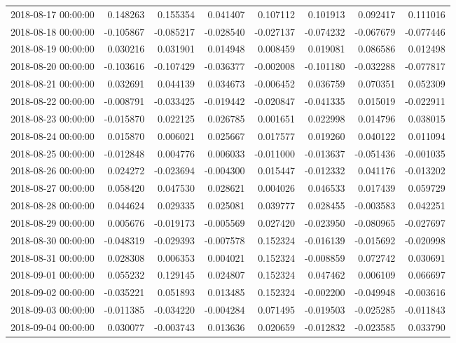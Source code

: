 \begin{tabular}{lrrrrrrr}
2018-08-17 00:00:00 & 0.148263 & 0.155354 & 0.041407 & 0.107112 & 0.101913 & 0.092417 & 0.111016 \\
2018-08-18 00:00:00 & -0.105867 & -0.085217 & -0.028540 & -0.027137 & -0.074232 & -0.067679 & -0.077446 \\
2018-08-19 00:00:00 & 0.030216 & 0.031901 & 0.014948 & 0.008459 & 0.019081 & 0.086586 & 0.012498 \\
2018-08-20 00:00:00 & -0.103616 & -0.107429 & -0.036377 & -0.002008 & -0.101180 & -0.032288 & -0.077817 \\
2018-08-21 00:00:00 & 0.032691 & 0.044139 & 0.034673 & -0.006452 & 0.036759 & 0.070351 & 0.052309 \\
2018-08-22 00:00:00 & -0.008791 & -0.033425 & -0.019442 & -0.020847 & -0.041335 & 0.015019 & -0.022911 \\
2018-08-23 00:00:00 & -0.015870 & 0.022125 & 0.026785 & 0.001651 & 0.022998 & 0.014796 & 0.038015 \\
2018-08-24 00:00:00 & 0.015870 & 0.006021 & 0.025667 & 0.017577 & 0.019260 & 0.040122 & 0.011094 \\
2018-08-25 00:00:00 & -0.012848 & 0.004776 & 0.006033 & -0.011000 & -0.013637 & -0.051436 & -0.001035 \\
2018-08-26 00:00:00 & 0.024272 & -0.023694 & -0.004300 & 0.015447 & -0.012332 & 0.041176 & -0.013202 \\
2018-08-27 00:00:00 & 0.058420 & 0.047530 & 0.028621 & 0.004026 & 0.046533 & 0.017439 & 0.059729 \\
2018-08-28 00:00:00 & 0.044624 & 0.029335 & 0.025081 & 0.039777 & 0.028455 & -0.003583 & 0.042251 \\
2018-08-29 00:00:00 & 0.005676 & -0.019173 & -0.005569 & 0.027420 & -0.023950 & -0.080965 & -0.027697 \\
2018-08-30 00:00:00 & -0.048319 & -0.029393 & -0.007578 & 0.152324 & -0.016139 & -0.015692 & -0.020998 \\
2018-08-31 00:00:00 & 0.028308 & 0.006353 & 0.004021 & 0.152324 & -0.008859 & 0.072742 & 0.030691 \\
2018-09-01 00:00:00 & 0.055232 & 0.129145 & 0.024807 & 0.152324 & 0.047462 & 0.006109 & 0.066697 \\
2018-09-02 00:00:00 & -0.035221 & 0.051893 & 0.013485 & 0.152324 & -0.002200 & -0.049948 & -0.003616 \\
2018-09-03 00:00:00 & -0.011385 & -0.034220 & -0.004284 & 0.071495 & -0.019503 & -0.025285 & -0.011843 \\
2018-09-04 00:00:00 & 0.030077 & -0.003743 & 0.013636 & 0.020659 & -0.012832 & -0.023585 & 0.033790 \\

\end{tabular}
